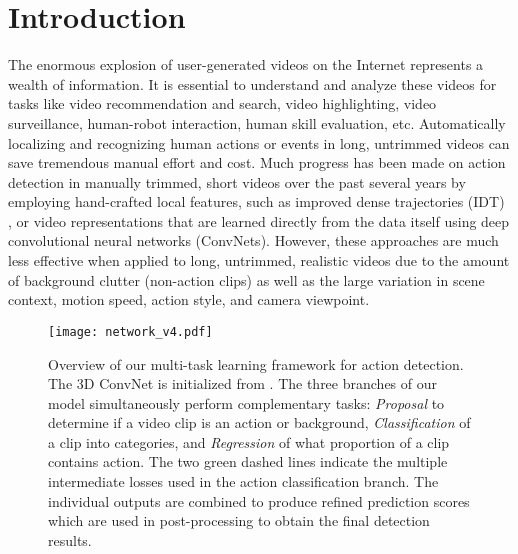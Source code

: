 \documentclass[10pt,twocolumn,letterpaper]{article}
\begin{document}
\section{Introduction}
\label{sec:intro}
The enormous explosion of user-generated videos on the Internet represents a wealth of information. It is essential to understand and analyze these videos for tasks like video recommendation and search, video highlighting, video surveillance, human-robot interaction, human skill evaluation, etc. Automatically localizing and recognizing human actions or events in long, untrimmed videos can save tremendous manual effort and cost.
Much progress has been made on action detection in manually trimmed, short videos over the past several years \cite{yizhu_depth2action_eccvw_2016,15000object2015,Objects2action_Jain_iccv15,actionLocal_context_Soomro_iccv15,actionLocal_track_Weinzaepfel_iccv15,action_tubes_cvpr15_Gkioxari} by employing hand-crafted local features, such as improved dense trajectories (IDT) \cite{idtfWang2013}, or video representations that are learned directly from the data itself using deep convolutional neural networks (ConvNets). However, these approaches are much less effective when applied to long, untrimmed, realistic videos due to the amount of background clutter (non-action clips) as well as the large variation in scene context, motion speed, action style, and camera viewpoint. 

\begin{figure*}[t]
	\centering
	\texttt{[image: network\_v4.pdf]}
	\vspace{-46ex}
	\caption{Overview of our multi-task learning framework for action detection. The 3D ConvNet is initialized from \cite{c3d2015}. The three branches of our model simultaneously perform complementary tasks: \textit{Proposal} to determine if a video clip is an action or background, \textit{Classification} of a clip into categories, and \textit{Regression} of what proportion of a clip contains action. The two green dashed lines indicate the multiple intermediate losses used in the action classification branch. The individual outputs are combined to produce refined prediction scores which are used in post-processing to obtain the final detection results.}
	\label{fig:modelConfigure}
	\vspace{-1ex}
\end{figure*}
\end{document}
